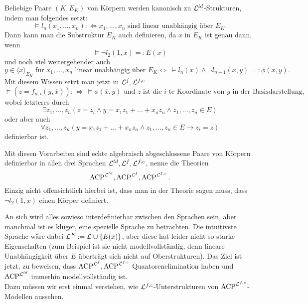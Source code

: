     \newpage
    
    \begin{lemma}\label{Symbolik}
    	Beliebige Paare $(K,E_K)$ von Körpern werden kanonisch zu $\mathcal{L}^{ld}$-Strukturen, indem man folgendes setzt:
    	$$\models l_n(x_1,\dots,x_n):\Leftrightarrow x_1,\dots,x_n\text{ sind linear unabhängig über }E_K.$$
    	Dann kann man die Substruktur $E_K$ auch definieren, da $x$ in $E_K$ ist genau dann, wenn $$\models\neg l_2(1,x)=:E(x)$$ und noch viel weitergehender auch $$y\in\langle\overline{x}\rangle_{E_K}\text{ für } x_1,\dots,x_n\text{ linear unabhängig über }E_K\Leftrightarrow\ \models l_n(\overline{x})\land\neg l_{n+1}(\overline{x},y)=:\phi(\overline{x},y).$$
    	Mit diesem Wissen setzt man jetzt in $\mathcal{L}^f,\mathcal{L}^{f,c}$
    	$$\models (z=f_{n,i}(y,\overline{x})):\Leftrightarrow\ \models\phi(\overline{x},y)\text{ und }z\text{ ist die }i\text{-te Koordinate von }y\text{ in der Basisdarstellung},$$
    	wobei letzteres durch $$\exists z_1,\dots,z_n(z=z_i\land y=x_1z_1+\dots+x_nz_n\land z_1,\dots,z_n\in E)$$ oder aber auch $$\forall z_1,\dots,z_n(y=x_1z_1+\dots+x_nz_n\land z_1,\dots,z_n\in E\rightarrow z_i=z)$$ definierbar ist.
    \end{lemma}
    
    \begin{lemma}
    	Mit diesen Vorarbeiten sind echte algebraisch abgeschlossene Paare von Körpern definierbar in allen drei Sprachen $\mathcal{L}^{ld},\mathcal{L}^f,\mathcal{L}^{f,c}$, nenne die Theorien $$\operatorname{ACP}^{\mathcal{L}^{ld}},\operatorname{ACP}^{\mathcal{L}^f},\operatorname{ACP}^{\mathcal{L}^{f,c}}.$$ Einzig nicht offensichtlich hierbei ist, dass man in der Theorie sagen muss, dass $\neg l_2(1,x)$ einen Körper definiert.
    \end{lemma}
    \newpage
    An sich wird alles sowieso interdefinierbar zwischen den Sprachen sein, aber manchmal ist es klüger, eine spezielle Sprache zu betrachten. Die intuitivste Sprache wäre dabei $\mathcal{L}^E:=\mathcal{L}\cup\{E(x)\}$, aber diese hat leider nicht so starke Eigenschaften (zum Beispiel ist sie nicht modellvollständig, denn lineare Unabhängigkeit über $E$ überträgt sich nicht auf Oberstrukturen). Das Ziel ist jetzt, zu beweisen, dass $\operatorname{ACP}^{\mathcal{L}^f},\operatorname{ACP}^{\mathcal{L}^{f,c}}$ Quantoren\-eli\-mi\-na\-tion haben und $\operatorname{ACP}^{\mathcal{L}^{ld}}$ immerhin modellvollständig ist.\\
    Dazu müssen wir erst einmal verstehen, wie $\mathcal{L}^{f,c}$-Unterstrukturen von $\operatorname{ACP}^{\mathcal{L}^{f,c}}$-Modellen aussehen.
    
